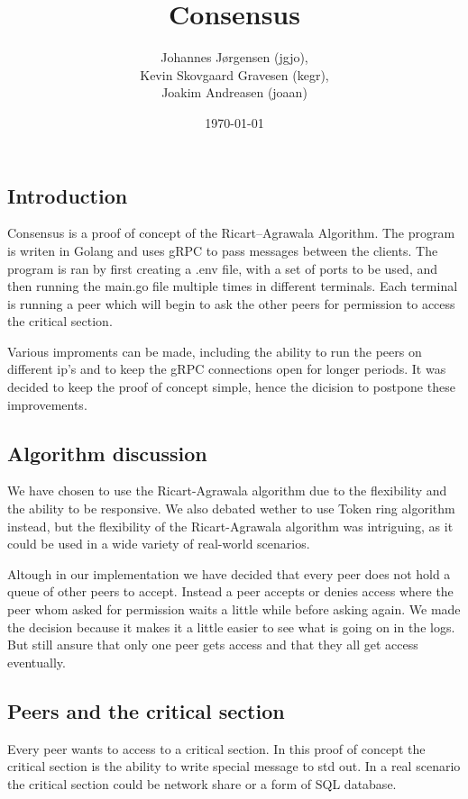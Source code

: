 \documentclass[a4paper,11pt]{article}
\title{Consensus}
\author{Johannes Jørgensen (jgjo),\\ Kevin Skovgaard Gravesen (kegr),\\ Joakim Andreasen (joaan)}
\date{\today}
\begin{document}
 

\maketitle

\subsection*{Introduction}
Consensus is a proof of concept of the Ricart–Agrawala Algorithm. The program is writen in Golang and uses gRPC to pass messages between the clients.
The program is ran by first creating a .env file, with a set of ports to be used, and then running the main.go file multiple times in different terminals.
Each terminal is running a peer which will begin to ask the other peers for permission to access the critical section.

Various improments can be made, including the ability to run the peers on different ip's and to keep the gRPC connections open for longer periods.
It was decided to keep the proof of concept simple, hence the dicision to postpone these improvements.

\subsection*{Algorithm discussion}
We have chosen to use the Ricart-Agrawala algorithm due to the flexibility and the ability to be responsive. We also debated wether to use Token ring algorithm instead, but the flexibility of the Ricart-Agrawala algorithm was intriguing, as it could be used in a wide variety of real-world scenarios.

Altough in our implementation we have decided that every peer does not hold a queue of other peers to accept. Instead a peer accepts or denies access where the peer whom asked for permission waits a little while before asking again.
We made the decision because it makes it a little easier to see what is going on in the logs. But still ansure that only one peer gets access and that they all get access eventually.

\subsection*{Peers and the critical section}
Every peer wants to access to a critical section. In this proof of concept the critical section is the ability to write special message to std out.
In a real scenario the critical section could be network share or a form of SQL database.
\end{document}
